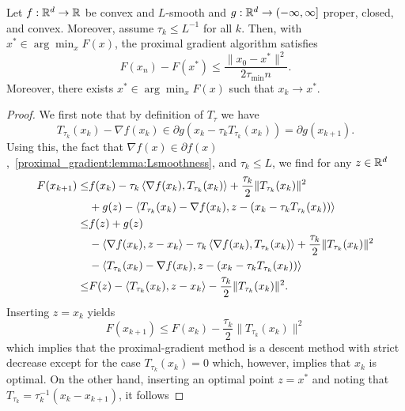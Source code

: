 \begin{theorem}
    Let $f:\mathbb{R}^d\rightarrow\mathbb{R}$ be convex and $L$-smooth and $g:\mathbb{R}^d\rightarrow(-\infty,\infty]$ proper, closed, and convex. Moreover, assume $\tau_k\leq L^{-1}$ for all $k$. Then, with $x^*\in\arg\min_x F(x)$, the proximal gradient algorithm satisfies
    \begin{equation}
        F(x_{n})-F(x^*)\leq \frac{\|x_{0}-x^*\|^2}{2\tau_{\min} n}.
    \end{equation}
    Moreover, there exists $x^*\in\arg\min_x F(x)$ such that $x_k\rightarrow x^*$.
\end{theorem}
\begin{proof}
    We first note that by definition of $T_\tau$ we have
    \begin{equation}
        T_{\tau_k}(x_k)-\nabla f(x_k)\in \partial g(x_k-\tau_k T_{\tau_k}(x_k)) = \partial g(x_{k+1}).
    \end{equation}
    Using this, the fact that $\nabla f(x)\in \partial f(x)$,~\cref{proximal_gradient:lemma:Lsmoothness}, and $\tau_k\leq L$, we find for any $z\in\mathbb{R}^d$
    \begin{equation}
        \begin{aligned}
            F(x_{k+1})
            \leq& f(x_k) -\tau_k\left\langle\nabla f(x_k) , T_{\tau_k}(x_k)\right\rangle + \frac{\tau_k}{2}\|T_{\tau_k}(x_k)\|^2\\
            &+g(z) - \left\langle T_{\tau_k}(x_k)-\nabla f(x_k) , z - (x_k-\tau_k T_{\tau_k}(x_k))\right\rangle\\
            \leq& f(z) + g(z)\\
            &- \left\langle\nabla f(x_k) , z-x_k\right\rangle-\tau_k\left\langle\nabla f(x_k) , T_{\tau_k}(x_k)\right\rangle + \frac{\tau_k}{2}\|T_{\tau_k}(x_k)\|^2\\
            &- \left\langle T_{\tau_k}(x_k)-\nabla f(x_k) , z - (x_k-\tau_k T_{\tau_k}(x_k))\right\rangle\\
            \leq& F(z) - \left\langle T_{\tau_k}(x_k) , z - x_k\right\rangle -\frac{\tau_k}{2}\|T_{\tau_k}(x_k)\|^2.
        \end{aligned}
    \end{equation}
    Inserting $z=x_k$ yields
    \begin{equation}
        F(x_{k+1})\leq F(x_k) - \frac{\tau_k}{2}\|T_{\tau_k}(x_k)\|^2
    \end{equation}
    which implies that the proximal-gradient method is a descent method with strict decrease except for the case $T_{\tau_k}(x_k)=0$ which, however, implies that $x_k$ is optimal. On the other hand, inserting an optimal point $z=x^*$ and noting that $T_{\tau_k} = \tau_k^{-1}(x_k-x_{k+1})$, it follows

\end{proof}
